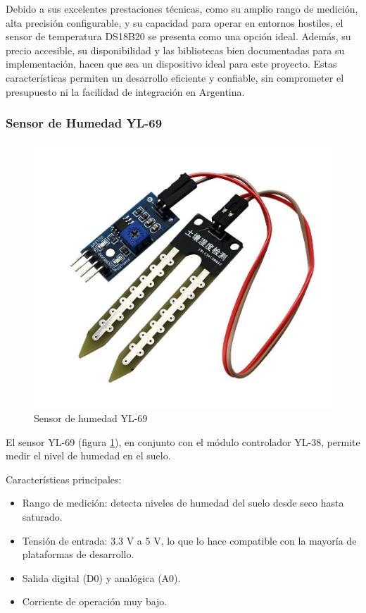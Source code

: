 Debido a sus excelentes prestaciones técnicas, como su amplio rango de medición, alta precisión configurable, y su capacidad para operar en entornos hostiles, el sensor de temperatura DS18B20 se presenta como una opción ideal. Además, su precio accesible, su disponibilidad y las bibliotecas bien documentadas para su implementación, hacen que sea un dispositivo ideal para este proyecto. Estas características permiten un desarrollo eficiente y confiable, sin comprometer el presupuesto ni la facilidad de integración en Argentina.

\subsubsection{Sensor de Humedad YL-69}

\begin{figure}[H]
	\centering
	\includegraphics[scale=1]{./Figures/Hardware/Sensores/sensorhumedad.png}
	\caption{Sensor de humedad YL-69}
	\label{fig:SensorHumedad}
\end{figure}

\label{sec:SensorHumedad}

El sensor YL-69 (figura \ref{fig:SensorHumedad}), en conjunto con el módulo controlador YL-38, permite medir el nivel de humedad en el suelo.  

Características principales:

\begin{itemize}
    \item Rango de medición: detecta niveles de humedad del suelo desde seco hasta saturado.
    \item Tensión de entrada: 3.3 V a 5 V, lo que lo hace compatible con la mayoría de plataformas de desarrollo.
    \item Salida digital (D0) y analógica (A0).
    \item Corriente de operación muy bajo.
\end{itemize}

